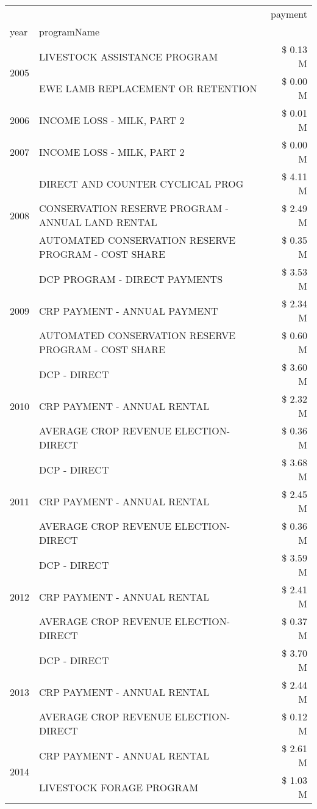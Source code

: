 \begin{tabular}{llr}
\toprule
 &  & payment \\
year & programName &  \\
\midrule
\multirow[t]{2}{*}{2005} & LIVESTOCK ASSISTANCE PROGRAM & \$ 0.13 M \\
 & EWE LAMB REPLACEMENT OR RETENTION & \$ 0.00 M \\
\cline{1-3}
2006 & INCOME LOSS - MILK, PART 2 & \$ 0.01 M \\
\cline{1-3}
2007 & INCOME LOSS - MILK, PART 2 & \$ 0.00 M \\
\cline{1-3}
\multirow[t]{3}{*}{2008} & DIRECT AND COUNTER CYCLICAL PROG & \$ 4.11 M \\
 & CONSERVATION RESERVE PROGRAM - ANNUAL LAND RENTAL & \$ 2.49 M \\
 & AUTOMATED CONSERVATION RESERVE PROGRAM - COST SHARE & \$ 0.35 M \\
\cline{1-3}
\multirow[t]{3}{*}{2009} & DCP PROGRAM - DIRECT PAYMENTS & \$ 3.53 M \\
 & CRP PAYMENT - ANNUAL PAYMENT & \$ 2.34 M \\
 & AUTOMATED CONSERVATION RESERVE PROGRAM - COST SHARE & \$ 0.60 M \\
\cline{1-3}
\multirow[t]{3}{*}{2010} & DCP - DIRECT & \$ 3.60 M \\
 & CRP PAYMENT - ANNUAL RENTAL & \$ 2.32 M \\
 & AVERAGE CROP REVENUE ELECTION-DIRECT & \$ 0.36 M \\
\cline{1-3}
\multirow[t]{3}{*}{2011} & DCP - DIRECT & \$ 3.68 M \\
 & CRP PAYMENT - ANNUAL RENTAL & \$ 2.45 M \\
 & AVERAGE CROP REVENUE ELECTION-DIRECT & \$ 0.36 M \\
\cline{1-3}
\multirow[t]{3}{*}{2012} & DCP - DIRECT & \$ 3.59 M \\
 & CRP PAYMENT - ANNUAL RENTAL & \$ 2.41 M \\
 & AVERAGE CROP REVENUE ELECTION-DIRECT & \$ 0.37 M \\
\cline{1-3}
\multirow[t]{3}{*}{2013} & DCP - DIRECT & \$ 3.70 M \\
 & CRP PAYMENT - ANNUAL RENTAL & \$ 2.44 M \\
 & AVERAGE CROP REVENUE ELECTION-DIRECT & \$ 0.12 M \\
\cline{1-3}
\multirow[t]{3}{*}{2014} & CRP PAYMENT - ANNUAL RENTAL & \$ 2.61 M \\
 & LIVESTOCK FORAGE PROGRAM & \$ 1.03 M \\

\end{tabular}
